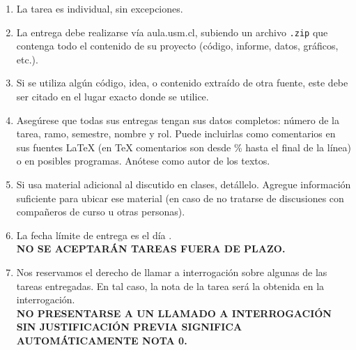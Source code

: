 
\begin{enumerate}[(1)]
  \item La tarea es individual, sin excepciones.
  \item La entrega debe realizarse vía aula.usm.cl, subiendo un archivo \verb|.zip| que contenga todo el contenido de su proyecto (código, informe, datos, gráficos, etc.).
  \item Si se utiliza algún código, idea, o contenido extraído de otra fuente, este debe ser citado en el lugar exacto donde se utilice.
  \item Asegúrese que todas sus entregas tengan sus datos completos: número de la tarea, ramo, semestre, nombre y rol. Puede incluirlas como comentarios en sus fuentes \LaTeX{} (en \TeX{} comentarios son desde \% hasta el final de la línea) o en posibles programas. Anótese como autor de los textos.
  \item Si usa material adicional al discutido en clases, detállelo. Agregue información suficiente para ubicar ese material (en caso de no tratarse de discusiones con compañeros de curso u otras personas).
  \item La fecha límite de entrega es el día \deadline. \\ \textbf{NO SE ACEPTARÁN TAREAS FUERA DE PLAZO.}
  \item Nos reservamos el derecho de llamar a interrogación sobre algunas de las tareas entregadas. En tal caso, la nota de la tarea será la obtenida en la interrogación. \\ \textbf{NO PRESENTARSE A UN LLAMADO A INTERROGACIÓN SIN JUSTIFICACIÓN PREVIA SIGNIFICA AUTOMÁTICAMENTE NOTA 0.}
\end{enumerate}
